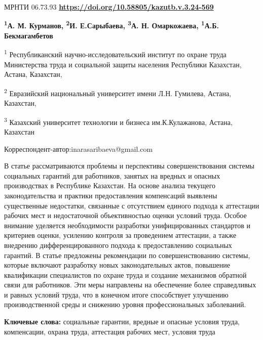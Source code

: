 \newpage
МРНТИ 06.73.93
\hfill {\bfseries \href{https://doi.org/10.58805/kazutb.v.3.24-569}{https://doi.org/10.58805/kazutb.v.3.24-569}}


\begin{center}
{\bfseries \textsuperscript{1}А. М. Курманов, \textsuperscript{2}И.
Е.Сарыбаева\envelope, \textsuperscript{3}А. Н. Омаркожаева,
\textsuperscript{1}А.Б. Бекмагамбетов}

\textsuperscript{1} Республиканский научно-исследовательский институт по
охране труда Министерства труда и социальной защиты населения Республики
Казахстан, Астана, Казахстан,

\textsuperscript{2} Евразийский национальный университет имени Л.Н.
Гумилева, Астана, Казахстан,

\textsuperscript{3} Казахский университет технологии и бизнеса
им.К.Кулажанова, Астана, Казахстан
\end{center}

\envelope Корреспондент-автор:inarasaribaeva@gmail.com

В статье рассматриваются проблемы и перспективы совершенствования
системы социальных гарантий для работников, занятых на вредных и опасных
производствах в Республике Казахстан. На основе анализа текущего
законодательства и практики предоставления компенсаций выявлены
существенные недостатки, связанные с отсутствием единого подхода к
аттестации рабочих мест и недостаточной объективностью оценки условий
труда. Особое внимание уделяется необходимости разработки
унифицированных стандартов и критериев оценки, усилению контроля за
проведением аттестации, а также внедрению дифференцированного подхода к
предоставлению социальных гарантий. В статье предложены рекомендации по
совершенствованию системы, которые включают разработку новых
законодательных актов, повышение квалификации специалистов по охране
труда и создание механизмов обратной связи для работников. Эти меры
направлены на обеспечение более справедливых и равных условий труда, что
в конечном итоге способствует улучшению производственной среды и
снижению уровня профессиональных заболеваний.

{\bfseries Ключевые слова:} социальные гарантии, вредные и опасные условия
труда, компенсации, охрана труда, аттестация рабочих мест, условия труда

